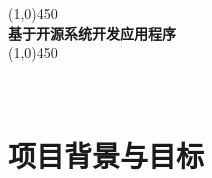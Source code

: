 \documentclass[UTF8]{ctexart}
\author{赵禹惟}
\date{2024.12.25}
\begin{document}
\begin{titlepage}
    \begin{center}
    	\vspace*{4cm}
        \line(1,0){450} \\ 
        [5mm]
        {\fontsize{36}{25}\selectfont \textbf{基于开源系统开发应用程序}} \\
        \line(1,0){450} \\
        \hspace{35mm}
        \begin{flushright}
        		{\fontsize{25}{25}\selectfont {-- nim移植LoongArch}} \\
		\end{flushright}
    \end{center}
    
    \vspace{80mm}\hspace{-35mm}
    
    \begin{flushright}
    		{\fontsize{20}{25}}
    \end{flushright}
\end{titlepage}

\tableofcontents
\newpage

\section{项目背景与目标} %
\end{document}
